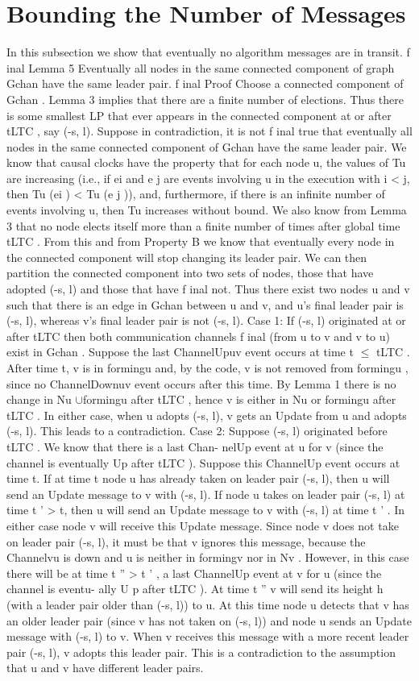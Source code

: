 \section{Bounding the Number of Messages}
In this subsection we show that eventually no algorithm messages are in transit. f inal Lemma 5 Eventually all nodes in the same connected component of graph Gchan have the same leader pair. f inal Proof Choose a connected component of Gchan . Lemma 3 implies that there are a finite number of elections. Thus there is some smallest LP that ever appears in the connected component at or after tLTC , say (-s, l). Suppose in contradiction, it is not f inal true that eventually all nodes in the same connected component of Gchan have the same leader pair. We know that causal clocks have the property that for each node u, the values of Tu are increasing (i.e., if ei and e j are events involving u in the execution with i < j, then Tu (ei ) < Tu (e j )), and, furthermore, if there is an infinite number of events involving u, then Tu increases without bound. We also know from Lemma 3 that no node elects itself more than a finite number of times after global time tLTC . From this and from Property B we know that eventually every node in the connected component will stop changing its leader pair. We can then partition the connected component into two sets of nodes, those that have adopted (-s, l) and those that have f inal not. Thus there exist two nodes u and v such that there is an edge in Gchan between u and v, and u’s final leader pair is (-s, l), whereas v’s final leader pair is not (-s, l). Case 1: If (-s, l) originated at or after tLTC then both communication channels f inal (from u to v and v to u) exist in Gchan . Suppose the last ChannelUpuv event occurs at time t $\leq$ tLTC . After time t, v is in formingu and, by the code, v is not removed from formingu , since no ChannelDownuv event occurs after this time. By Lemma 1 there is no change in Nu $\cup$formingu after tLTC , hence v is either in Nu or formingu after tLTC . In either case, when u adopts (-s, l), v gets an Update from u and adopts (-s, l). This leads to a contradiction. Case 2: Suppose (-s, l) originated before tLTC . We know that there is a last Chan- nelUp event at u for v (since the channel is eventually Up after tLTC ). Suppose this ChannelUp event occurs at time t. If at time t node u has already taken on leader pair (-s, l), then u will send an Update message to v with (-s, l). If node u takes on leader pair (-s, l) at time t ' > t, then u will send an Update message to v with (-s, l) at time t ' . In either case node v will receive this Update message. Since node v does not take on leader pair (-s, l), it must be that v ignores this message, because the Channelvu is down and u is neither in formingv nor in Nv . However, in this case there will be at time t '' > t ' , a last ChannelUp event at v for u (since the channel is eventu- ally U p after tLTC ). At time t '' v will send its height h (with a leader pair older than (-s, l)) to u. At this time node u detects that v has an older leader pair (since v has not taken on (-s, l)) and node u sends an Update message with (-s, l) to v. When v receives this message with a more recent leader pair (-s, l), v adopts this leader pair. This is a contradiction to the assumption that u and v have different leader pairs.
